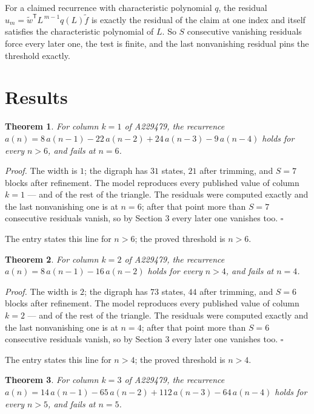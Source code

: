 \documentclass[11pt]{article}
\newtheorem{theorem}{Theorem}
\theoremstyle{definition}
\begin{document}
For a claimed recurrence with characteristic polynomial $q$, the residual $u_m = \tilde w^{\mathsf T}L^{\,m-1}q(L)\tilde f$ is exactly the residual of the claim at one index and itself satisfies the characteristic polynomial of $L$. So $S$ consecutive vanishing residuals force every later one, the test is finite, and the last nonvanishing residual pins the threshold exactly.

\section{Results}

\begin{theorem} For column $k = 1$ of A229479, the recurrence $a(n) = 8\,a(n-1) - 22\,a(n-2) + 24\,a(n-3) - 9\,a(n-4)$ holds for every $n > 6$, and fails at $n = 6$.\end{theorem}

{\itshape Proof.} The width is $1$; the digraph has $31$ states, $21$ after trimming, and $S = 7$ blocks after refinement. The model reproduces every published value of column $k = 1$ --- and of the rest of the triangle. The residuals were computed exactly and the last nonvanishing one is at $n = 6$; after that point more than $S = 7$ consecutive residuals vanish, so by Section 3 every later one vanishes too. $\square$

The entry states this line for $n > 6$; the proved threshold is $n > 6$.

\begin{theorem} For column $k = 2$ of A229479, the recurrence $a(n) = 8\,a(n-1) - 16\,a(n-2)$ holds for every $n > 4$, and fails at $n = 4$.\end{theorem}

{\itshape Proof.} The width is $2$; the digraph has $73$ states, $44$ after trimming, and $S = 6$ blocks after refinement. The model reproduces every published value of column $k = 2$ --- and of the rest of the triangle. The residuals were computed exactly and the last nonvanishing one is at $n = 4$; after that point more than $S = 6$ consecutive residuals vanish, so by Section 3 every later one vanishes too. $\square$

The entry states this line for $n > 4$; the proved threshold is $n > 4$.

\begin{theorem} For column $k = 3$ of A229479, the recurrence $a(n) = 14\,a(n-1) - 65\,a(n-2) + 112\,a(n-3) - 64\,a(n-4)$ holds for every $n > 5$, and fails at $n = 5$.\end{theorem}
\end{document}
